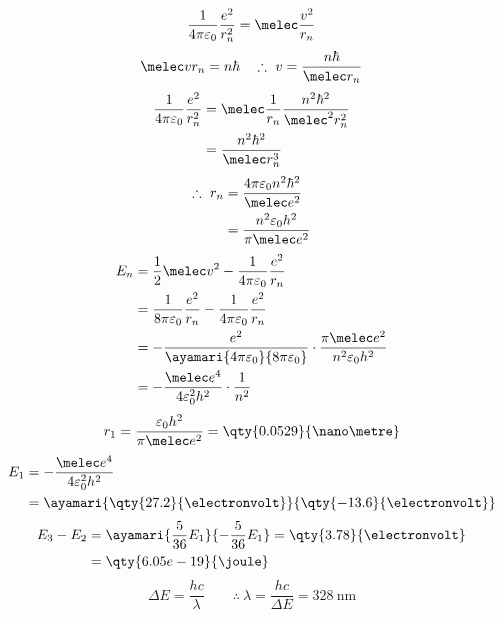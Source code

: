 \[ \frac{1}{4\pi\varepsilon_{0}}\frac{e^{2}}{r_{n}^{2}}=\melec\frac{v^{2}}{r_{n}} \]
\[ \melec vr_{n}=n\hbar\quad\therefore\ v=\frac{n\hbar}{\melec r_{n}} \]
\begin{align*}
\frac{1}{4\pi\varepsilon_{0}}\frac{e^{2}}{r_{n}^{2}}&=\melec\frac{1}{r_{n}}\frac{n^{2}\hbar^{2}}{\melec^{2}r_{n}^{2}}\\
&=\frac{n^{2}\hbar^{2}}{\melec r_{n}^{3}}
\end{align*}
\begin{align*}
\therefore\ r_{n}&=\frac{4\pi\varepsilon_{0}n^{2}\hbar^{2}}{\melec e^{2}}\\
&=\frac{n^{2}\varepsilon_{0}h^{2}}{\pi\melec e^{2}}
\end{align*}
\begin{align*}
E_{n}&=\frac{1}{2}\melec v^{2}-\frac{1}{4\pi\varepsilon_{0}}\frac{e^{2}}{r_{n}}\\
&=\frac{1}{8\pi\varepsilon_{0}}\frac{e^{2}}{r_{n}}-\frac{1}{4\pi\varepsilon_{0}}\frac{e^{2}}{r_{n}}\\
&=-\frac{e^{2}}{\ayamari{4\pi\varepsilon_{0}}{8\pi\varepsilon_{0}}}\cdot\frac{\pi\melec e^{2}}{n^{2}\varepsilon_{0}h^{2}}\\
&=-\frac{\melec e^{4}}{4\varepsilon_{0}^{2}h^{2}}\cdot\frac{1}{n^{2}}
\end{align*}
\[ r_{1}=\frac{\varepsilon_{0}h^{2}}{\pi\melec e^{2}}=\qty{0.0529}{\nano\metre} \]
\begin{align*}
E_{1}&=-\frac{\melec e^{4}}{4\varepsilon_{0}^{2}h^{2}}\\
&=\ayamari{\qty{27.2}{\electronvolt}}{\qty{-13.6}{\electronvolt}}
\end{align*}
\begin{align*}
E_{3}-E_{2}&=\ayamari{\frac{5}{36}E_{1}}{-\frac{5}{36}E_{1}}=\qty{3.78}{\electronvolt}\\
&=\qty{6.05e-19}{\joule}
\end{align*}
\[ \Delta E=\frac{hc}{\lambda}\qquad\therefore\ \lambda=\frac{hc}{\Delta E}=\qty{328}{\nano\metre} \]
